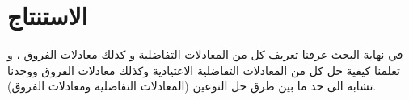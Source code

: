 \chapter*{الاستنتاج}
في نهاية البحث عرفنا تعريف كل من المعادلات التفاضلية و كذلك معادلات الفروق ، و تعلمنا كيفية حل كل من المعادلات التفاضلية الاعتيادية وكذلك معادلات الفروق ووجدنا تشابه الى حد ما بين طرق حل النوعين (المعادلات التفاضلية ومعادلات الفروق).